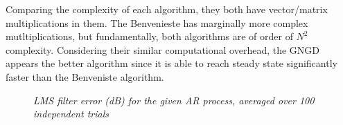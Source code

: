 \documentclass[./main.tex]{subfiles}
\begin{document}
Comparing the complexity of each algorithm, they both have vector/matrix multiplications in them. The Benvenieste has marginally more complex mutltiplications, but fundamentally, both algorithms are of order of $N^2$ complexity. Considering their similar computational overhead, the GNGD appears the better algorithm since it is able to reach steady state significantly faster than the Benveniste algorithm.

\begin{figure}[h]
	\centering 
	\resizebox{\textwidth}{!}{}
	\caption{\textit{LMS filter error (dB) for the given AR process, averaged over 100 independent trials}}
	\label{fig:3_2_c}
\end{figure}
\end{document}
